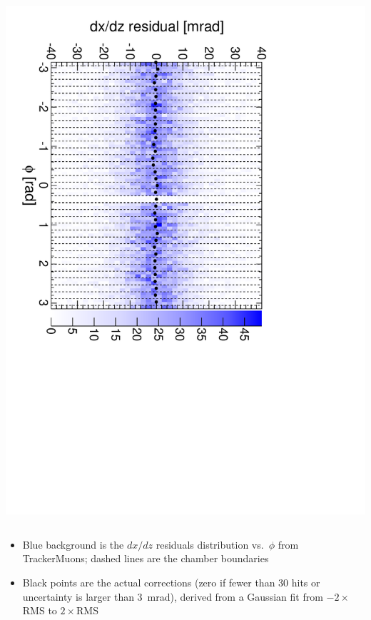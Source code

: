 \documentclass[compress]{beamer}
\begin{document}
\begin{frame}
\begin{columns}
\includegraphics[height=\linewidth, angle=90]{iter02_mem22.pdf}
\end{columns}

\begin{itemize}
\item Blue background is the $dx/dz$ residuals distribution
  vs.\ $\phi$ from TrackerMuons; dashed lines are the chamber boundaries
\item Black points are the actual corrections (zero if fewer than 30
  hits or uncertainty is larger than 3~mrad), derived from a Gaussian
  fit from $-2\times$RMS to $2\times$RMS
\end{itemize}
\end{frame}
\end{document}
